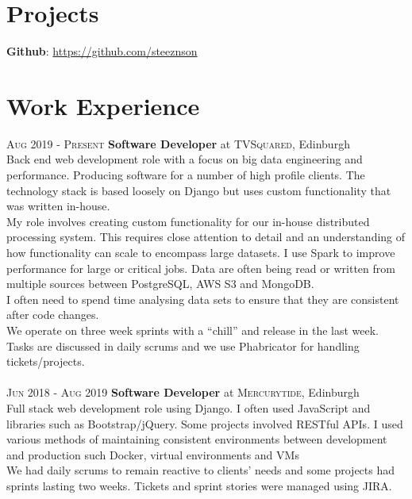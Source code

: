 \documentclass[14pt, a4paper]{extarticle}
\begin{document}
\begin{multicols}{2}
\section{Projects}
\noindent\textbf{Github}: \url{https://github.com/steeznson}

\columnbreak
\section{Work Experience}
\noindent\textsc{Aug 2019 - Present} \textbf{Software Developer}
at \textsc{TVSquared}, Edinburgh\\
Back end web development role with a focus on big data engineering and performance. Producing software for a number of high profile clients. The technology stack is based loosely on Django but uses custom functionality that was written in-house.\\ 
My role involves creating custom functionality for our in-house distributed processing system. This requires close attention to detail and an understanding of how functionality can scale to encompass large datasets. I use Spark to improve performance for large or critical jobs. Data are often being read or written from multiple sources between PostgreSQL, AWS S3 and MongoDB.\\
I often need to spend time analysing data sets to ensure that they are consistent after code changes.\\
We operate on three week sprints with a ``chill'' and release in the last week.  Tasks are discussed in daily scrums and we use Phabricator for handling tickets/projects.\\\\
\noindent\textsc{Jun 2018 - Aug 2019} \textbf{Software Developer}
at \textsc{Mercurytide}, Edinburgh\\
Full stack web development role using Django. I often used JavaScript and libraries such as Bootstrap/jQuery. Some projects involved RESTful APIs. I used various methods of maintaining consistent environments between development and production such Docker, virtual environments and VMs\\
We had daily scrums to remain reactive to clients' needs and some projects had sprints lasting two weeks. Tickets and sprint stories were managed using JIRA.\\
\end{multicols}
\end{document}
